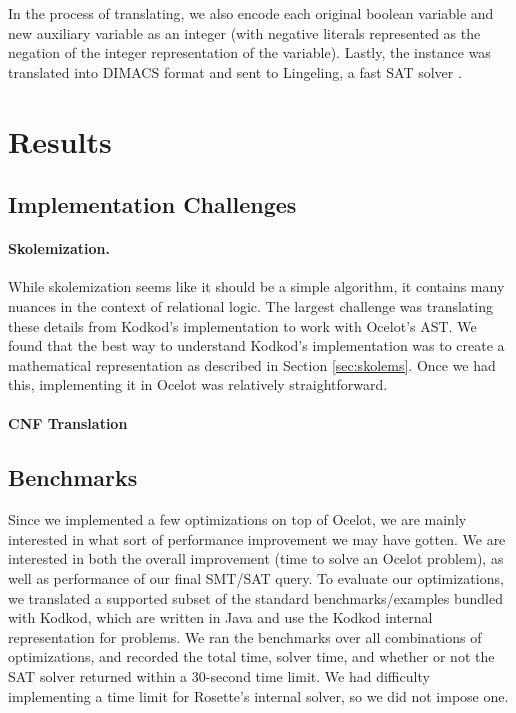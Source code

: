 \documentclass[10pt]{article}
\theoremstyle{definition}
\begin{document}
  In the process of translating, we also encode each original boolean variable and new auxiliary variable as an integer (with negative literals represented as the negation of the integer representation of the variable). Lastly, the instance was translated into DIMACS format and sent to Lingeling, a fast SAT solver \cite{biere17}.

  \section{Results}
  \subsection{Implementation Challenges}

  \paragraph{Skolemization.} While skolemization seems like it should be a simple algorithm, it contains many nuances in the context of relational logic. The largest challenge was translating these details from Kodkod's implementation to work with Ocelot's AST. We found that the best way to understand Kodkod's implementation was to create a mathematical representation as described in Section \ref{sec:skolems}. Once we had this, implementing it in Ocelot was relatively straightforward.

  \paragraph{CNF Translation}

  \subsection{Benchmarks}

  Since we implemented a few optimizations on top of Ocelot, we are mainly interested in what sort of performance improvement we may have gotten. We are interested in both the overall improvement (time to solve an Ocelot problem), as well as performance of our final SMT/SAT query. To evaluate our optimizations, we translated a supported subset of the standard benchmarks/examples bundled with Kodkod, which are written in Java and use the Kodkod internal representation for problems. We ran the benchmarks over all combinations of optimizations, and recorded the total time, solver time, and whether or not the SAT solver returned within a 30-second time limit. We had difficulty implementing a time limit for Rosette's internal solver, so we did not impose one.
\end{document}
